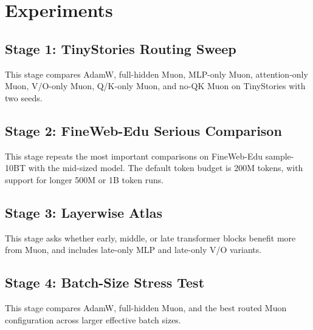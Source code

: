 \section{Experiments}

\subsection{Stage 1: TinyStories Routing Sweep}
This stage compares AdamW, full-hidden Muon, MLP-only Muon, attention-only Muon, V/O-only Muon, Q/K-only Muon, and no-QK Muon on TinyStories with two seeds.

\subsection{Stage 2: FineWeb-Edu Serious Comparison}
This stage repeats the most important comparisons on FineWeb-Edu sample-10BT with the mid-sized model. The default token budget is 200M tokens, with support for longer 500M or 1B token runs.

\subsection{Stage 3: Layerwise Atlas}
This stage asks whether early, middle, or late transformer blocks benefit more from Muon, and includes late-only MLP and late-only V/O variants.

\subsection{Stage 4: Batch-Size Stress Test}
This stage compares AdamW, full-hidden Muon, and the best routed Muon configuration across larger effective batch sizes.
